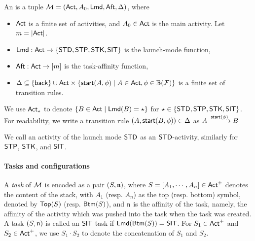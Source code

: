 \begin{definition} \label{def:afsm}
An {\AMASS} is a tuple ${\mathcal{M} } = ({\sf Act}, A_0, {\sf Lmd}, {\sf Aft}, \Delta)$, where 
\begin{itemize}
\item ${\sf Act}$ is a finite set of activities, and $A_0 \in {\sf Act}$ is the main activity. Let $m=|{\sf Act}|$.
\item ${\sf Lmd} : {\sf Act} \rightarrow \{{\sf STD},{\sf STP},{\sf STK},{\sf SIT}\}$ is the launch-mode function,
%
\item ${\sf Aft} : {\sf Act} \rightarrow [m]$ is the task-affinity function, 
%
\item $\Delta \subseteq \{{\mathsf{back} }\} \cup {\sf Act} \times \{{\mathsf{start} }(A,\phi)\mid A \in {\sf Act}, \phi \in \mathbb{B}(\mathcal{F})\}$ is a finite set of transition rules.
\end{itemize}
%
\end{definition}
We use ${\sf Act}_{\star}$ to denote $\{B\in{\sf Act}\mid {\sf Lmd}(B)= \star\}$ for $\star\in\{\mathsf{STD},\mathsf{STP},\mathsf{STK},\mathsf{SIT}\}$.
For readability, we write a transition rule $(A, {\mathsf{start} }(B, \phi))\in \Delta$ as $A \xrightarrow{{\mathsf{start} }(\phi)} B$


We call an activity of the launch mode $\mathsf{STD}$ as an $\mathsf{STD}$-activity, similarly for $\mathsf{STP}$, $\mathsf{STK}$, and $\mathsf{SIT}$. 



\paragraph{Tasks and configurations} A \emph{task} of ${\mathcal{M} }$ is encoded as a pair $(S, \mathfrak{n})$, where $S= [A_1, \cdots, A_n] \in {\sf Act}^+$ denotes the content of the stack, with $A_1$ (resp. $A_n$) as  the top (resp. bottom) symbol, denoted by $\mathsf{Top}(S)$ (resp. $\mathsf{Btm}(S)$), and $\mathfrak{n}$ is the affinity of the task, namely, the affinity of the activity which was pushed into the task when the task was created. A task $(S, \mathfrak{n})$ is called an $\mathsf{SIT}$-task if ${\sf Lmd}(\mathsf{Btm}(S)) = \mathsf{SIT}$.
For $S_1 \in {\sf Act}^+$ and $S_2 \in {\sf Act}^+$, we use $S_1 \cdot S_2$ to denote the concatenation of $S_1$ and $S_2$.

